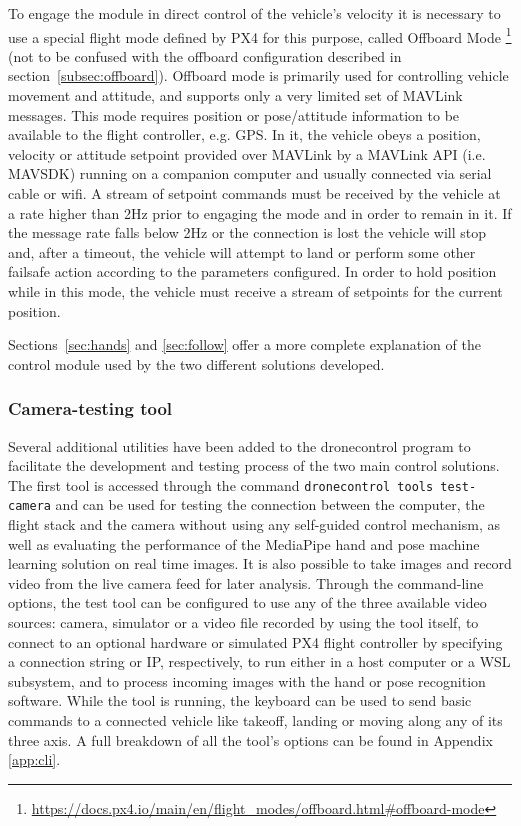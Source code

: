 To engage the module in direct control of the vehicle's velocity it is necessary to use a special flight mode defined by PX4 for this purpose, called Offboard Mode \footnote{\url{https://docs.px4.io/main/en/flight_modes/offboard.html\#offboard-mode}} (not to be confused with the offboard configuration described in section~\ref{subsec:offboard}).
Offboard mode is primarily used for controlling vehicle movement and attitude, and supports only a very limited set of MAVLink messages. This mode requires position or pose/attitude information to be available to the flight controller, e.g. GPS.
In it, the vehicle obeys a position, velocity or attitude setpoint provided over MAVLink by a MAVLink API (i.e. MAVSDK) running on a companion computer and usually connected via serial cable or wifi.
A stream of setpoint commands must be received by the vehicle at a rate higher than 2Hz prior to engaging the mode and in order to remain in it.
If the message rate falls below 2Hz or the connection is lost the vehicle will stop and, after a timeout, the vehicle will attempt to land or perform some other failsafe action according to the parameters configured.
In order to hold position while in this mode, the vehicle must receive a stream of setpoints for the current position.

Sections~\ref{sec:hands} and \ref{sec:follow} offer a more complete explanation of the control module used by the two different solutions developed.

\subsubsection{Camera-testing tool}
\label{subsec:cam-tool}

Several additional utilities have been added to the dronecontrol program to facilitate the development and testing process of the two main control solutions.
The first tool is accessed through the command \texttt{dronecontrol tools test-camera} and can be used for testing the connection between the computer, the flight stack and the camera without using any self-guided control mechanism, as well as evaluating the performance of the MediaPipe hand and pose machine learning solution on real time images.
It is also possible to take images and record video from the live camera feed for later analysis.
Through the command-line options, the test tool can be configured to use any of the three available video sources: camera, simulator or a video file recorded by using the tool itself,
to connect to an optional hardware or simulated PX4 flight controller by specifying a connection string or IP, respectively,
to run either in a host computer or a WSL subsystem,
and to process incoming images with the hand or pose recognition software.
While the tool is running, the keyboard can be used to send basic commands to a connected vehicle like takeoff, landing or moving along any of its three axis.
A full breakdown of all the tool's options can be found in Appendix \ref{app:cli}.




